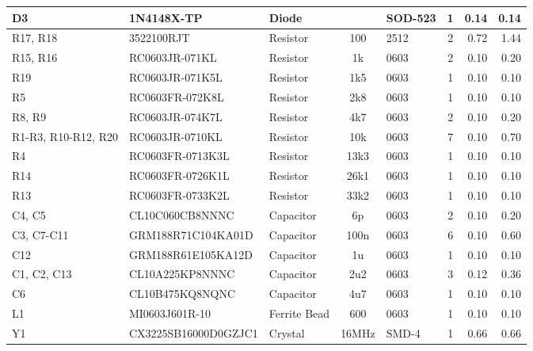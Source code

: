 \documentclass[openbib,letterpaper,10pt]{article}
\begin{document}
\begin{spacing}{1.15}
\begin{appendix}
\begin{singlespacing}
\begin{center}
\begin{longtable}{|l|l|l|c|l|c|r|r|}
			D3 & 1N4148X-TP & Diode & & SOD-523 & 1 & 0.14 & 0.14 \\ \hline

			R17, R18 & 3522100RJT & Resistor & 100 & 2512 & 2 & 0.72 & 1.44 \\ \hline

			R15, R16 & RC0603JR-071KL & Resistor & 1k & 0603 & 2 & 0.10 & 0.20 \\ \hline

			R19 & RC0603JR-071K5L & Resistor & 1k5 & 0603 & 1 & 0.10 & 0.10 \\ \hline

			R5 & RC0603FR-072K8L & Resistor & 2k8 & 0603 & 1 & 0.10 & 0.10 \\ \hline

			R8, R9 & RC0603JR-074K7L & Resistor & 4k7 & 0603 & 2 & 0.10 & 0.20 \\ \hline

			R1-R3, R10-R12, R20 & RC0603JR-0710KL & Resistor & 10k & 0603 & 7 & 0.10 & 0.70 \\ \hline

			R4 & RC0603FR-0713K3L & Resistor & 13k3 & 0603 & 1 & 0.10 & 0.10 \\ \hline

			R14 & RC0603FR-0726K1L & Resistor & 26k1 & 0603 & 1 & 0.10 & 0.10 \\ \hline

			R13 & RC0603FR-0733K2L & Resistor & 33k2 & 0603 & 1 & 0.10 & 0.10 \\ \hline

			C4, C5 & CL10C060CB8NNNC & Capacitor & 6p & 0603 & 2 & 0.10 & 0.20 \\ \hline

			C3, C7-C11 & GRM188R71C104KA01D & Capacitor & 100n & 0603 & 6 & 0.10 & 0.60 \\ \hline

			C12 & GRM188R61E105KA12D & Capacitor & 1u & 0603 & 1 & 0.10 & 0.10 \\ \hline

			C1, C2, C13 & CL10A225KP8NNNC & Capacitor & 2u2 & 0603 & 3 & 0.12 & 0.36 \\ \hline

			C6 & CL10B475KQ8NQNC & Capacitor & 4u7 & 0603 & 1 & 0.10 & 0.10 \\ \hline

			L1 & MI0603J601R-10 & Ferrite Bead & 600 & 0603 & 1 & 0.10 & 0.10 \\ \hline

			Y1 & CX3225SB16000D0GZJC1 & Crystal & 16MHz & SMD-4 & 1 & 0.66 & 0.66 \\ \hline


\end{longtable}
\end{center}
\end{singlespacing}
\end{appendix}
\end{spacing}
\end{document}
